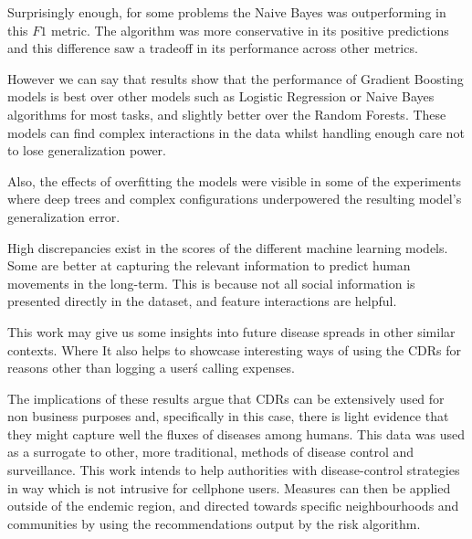Surprisingly enough, for some problems the Naive Bayes was outperforming in this $F1$ metric.
The algorithm was more conservative in its positive predictions and this difference saw a tradeoff in its performance across other metrics.

However we can say that results show that the performance of Gradient Boosting models is best over other models such as Logistic Regression or Naive Bayes algorithms for most tasks, and slightly better over the Random Forests.
These models can find complex interactions in the data whilst handling enough care not to lose generalization power.








Also, the effects of overfitting the models were visible in some of the experiments where deep trees and complex configurations underpowered the resulting model's generalization error.



High discrepancies exist in the scores of the different machine learning models.
Some are better at capturing the relevant information to predict human movements in the long-term.
This is because not all social information is presented directly in the dataset, and feature interactions are helpful.


This work may give us some insights into future disease spreads in other similar contexts.
Where
It also helps to showcase interesting ways of using the CDRs for reasons other than logging a user\'s calling expenses.



The implications of these results argue that CDRs can be extensively used for non business purposes and, specifically in this case, there is light evidence that they might capture well the fluxes of diseases among humans.
This data was used as a surrogate to other, more traditional, methods of disease control and surveillance.
This work intends to help authorities with disease-control strategies in way which is not intrusive for cellphone users.
Measures can then be applied outside of the endemic region, and directed towards specific neighbourhoods and communities by using the recommendations output by the risk algorithm.


